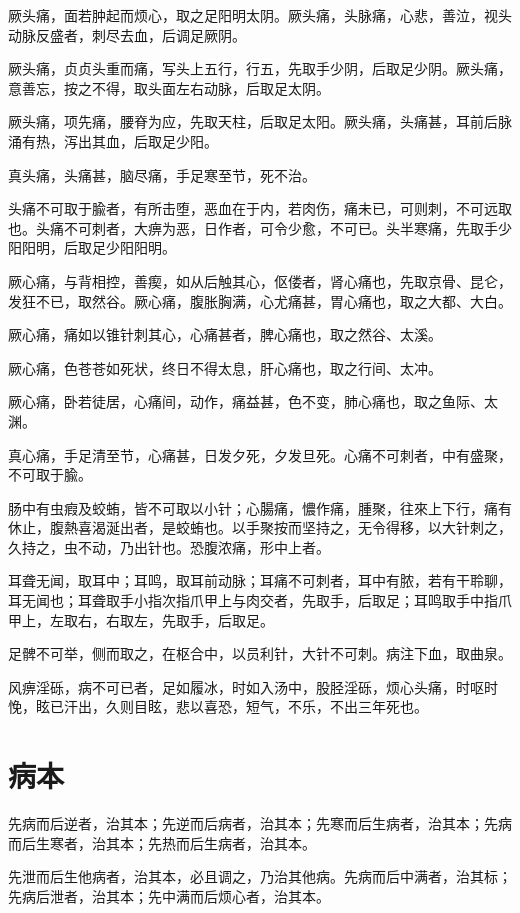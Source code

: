 \documentclass[a4paper,12pt,UTF8,twoside]{ctexbook}
\begin{document}
	厥头痛，面若肿起而烦心，取之足阳明太阴。厥头痛，头脉痛，心悲，善泣，视头动脉反盛者，刺尽去血，后调足厥阴。
	
	厥头痛，贞贞头重而痛，写头上五行，行五，先取手少阴，后取足少阴。厥头痛，意善忘，按之不得，取头面左右动脉，后取足太阴。
	
	厥头痛，项先痛，腰脊为应，先取天柱，后取足太阳。厥头痛，头痛甚，耳前后脉涌有热，泻出其血，后取足少阳。
	
	真头痛，头痛甚，脑尽痛，手足寒至节，死不治。
	
	头痛不可取于腧者，有所击堕，恶血在于内，若肉伤，痛未已，可则刺，不可远取也。头痛不可刺者，大痹为恶，日作者，可令少愈，不可已。头半寒痛，先取手少阳阳明，后取足少阳阳明。
	
	厥心痛，与背相控，善瘈，如从后触其心，伛偻者，肾心痛也，先取京骨、昆仑，发狂不已，取然谷。厥心痛，腹胀胸满，心尤痛甚，胃心痛也，取之大都、大白。
	
	厥心痛，痛如以锥针刺其心，心痛甚者，脾心痛也，取之然谷、太溪。
	
	厥心痛，色苍苍如死状，终日不得太息，肝心痛也，取之行间、太冲。
	
	厥心痛，卧若徒居，心痛间，动作，痛益甚，色不变，肺心痛也，取之鱼际、太渊。
	
	真心痛，手足清至节，心痛甚，日发夕死，夕发旦死。心痛不可刺者，中有盛聚，不可取于腧。
	
	肠中有虫瘕及蛟蛕，皆不可取以小针；心腸痛，憹作痛，腫聚，往來上下行，痛有休止，腹熱喜渴涎出者，是蛟蛕也。以手聚按而坚持之，无令得移，以大针刺之，久持之，虫不动，乃出针也。恐腹浓痛，形中上者。
	
	耳聋无闻，取耳中；耳鸣，取耳前动脉；耳痛不可刺者，耳中有脓，若有干聆聊，耳无闻也；耳聋取手小指次指爪甲上与肉交者，先取手，后取足；耳鸣取手中指爪甲上，左取右，右取左，先取手，后取足。
	
	足髀不可举，侧而取之，在枢合中，以员利针，大针不可刺。病注下血，取曲泉。
	
	风痹淫砾，病不可已者，足如履冰，时如入汤中，股胫淫砾，烦心头痛，时呕时悗，眩已汗出，久则目眩，悲以喜恐，短气，不乐，不出三年死也。
	\chapter{病本}
	
	先病而后逆者，治其本；先逆而后病者，治其本；先寒而后生病者，治其本；先病而后生寒者，治其本；先热而后生病者，治其本。
	
	先泄而后生他病者，治其本，必且调之，乃治其他病。先病而后中满者，治其标；先病后泄者，治其本；先中满而后烦心者，治其本。
	
\end{document}
